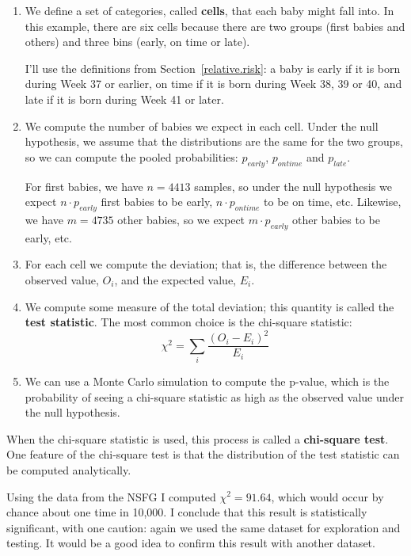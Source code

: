 \documentclass[12pt]{book}
\begin{document}
\begin{enumerate}

\item We define a set of categories, called {\bf cells}, that each
  baby might fall into.  In this example, there are six cells because
  there are two groups (first babies and others) and three bins
  (early, on time or late).

I'll use the definitions from Section~\ref{relative.risk}: a baby is
early if it is born during Week 37 or earlier, on time if it is born
during Week 38, 39 or 40, and late if it is born during Week 41 or
later.

\item We compute the number of babies we expect in each cell.  Under
  the null hypothesis, we assume that the distributions are the same
  for the two groups, so we can compute the pooled probabilities:
  $p_{early}$, $p_{ontime}$ and $p_{late}$.

For first babies, we have $n=4413$ samples, so under the null
hypothesis we expect $n \cdot p_{early}$ first babies to be early, $n
\cdot p_{ontime}$ to be on time, etc.  Likewise, we have $m=4735$
other babies, so we expect $m \cdot p_{early}$ other babies to be
early, etc.

\item For each cell we compute the deviation; that is, the difference
  between the observed value, $O_i$, and the expected value, $E_i$.

\item We compute some measure of the total deviation; this quantity
is called the {\bf test statistic}.  The most common
choice is the chi-square statistic:
%
  \[ \chi^2 = \sum_i \frac{(O_i - E_i)^2}{E_i} \]
%

\item We can use a Monte Carlo simulation to compute the p-value,
  which is the probability of seeing a chi-square statistic as high
  as the observed value under the null hypothesis.

\end{enumerate}

When the chi-square statistic is used, this process is called a 
{\bf chi-square test}.  One feature of the chi-square test is that
the distribution of the test statistic can be computed analytically.

Using the data from the NSFG I computed $\chi^2 = 91.64$, which would
occur by chance about one time in 10,000.  I conclude that this result
is statistically significant, with one caution: again we used the
same dataset for exploration and testing.  It would be a good idea
to confirm this result with another dataset.
\end{document}
